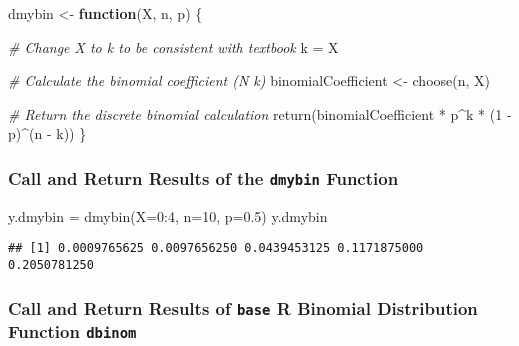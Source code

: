 \documentclass[
  12pt,
]{article}
\newenvironment{Shaded}{\begin{snugshade}}{\end{snugshade}}
\newcommand{\AttributeTok}[1]{\textcolor[rgb]{0.77,0.63,0.00}{#1}}
\newcommand{\CommentTok}[1]{\textcolor[rgb]{0.56,0.35,0.01}{\textit{#1}}}
\newcommand{\ControlFlowTok}[1]{\textcolor[rgb]{0.13,0.29,0.53}{\textbf{#1}}}
\newcommand{\DecValTok}[1]{\textcolor[rgb]{0.00,0.00,0.81}{#1}}
\newcommand{\FloatTok}[1]{\textcolor[rgb]{0.00,0.00,0.81}{#1}}
\newcommand{\FunctionTok}[1]{\textcolor[rgb]{0.00,0.00,0.00}{#1}}
\newcommand{\NormalTok}[1]{#1}
\newcommand{\OtherTok}[1]{\textcolor[rgb]{0.56,0.35,0.01}{#1}}
\newcommand{\SpecialCharTok}[1]{\textcolor[rgb]{0.00,0.00,0.00}{#1}}
\begin{document}
\begin{Shaded}
\begin{Highlighting}[]
\NormalTok{dmybin }\OtherTok{\textless{}{-}} \ControlFlowTok{function}\NormalTok{(X, n, p) \{}
  
  \CommentTok{\# Change X to k to be consistent with textbook}
\NormalTok{  k }\OtherTok{=}\NormalTok{ X}
  
  \CommentTok{\# Calculate the binomial coefficient (N k)}
\NormalTok{  binomialCoefficient }\OtherTok{\textless{}{-}} \FunctionTok{choose}\NormalTok{(n, X)}
  
  \CommentTok{\# Return the discrete binomial calculation}
  \FunctionTok{return}\NormalTok{(binomialCoefficient }\SpecialCharTok{*}\NormalTok{ p}\SpecialCharTok{\^{}}\NormalTok{k }\SpecialCharTok{*}\NormalTok{ (}\DecValTok{1} \SpecialCharTok{{-}}\NormalTok{ p)}\SpecialCharTok{\^{}}\NormalTok{(n }\SpecialCharTok{{-}}\NormalTok{ k))}
\NormalTok{\}}
\end{Highlighting}
\end{Shaded}

\hypertarget{call-and-return-results-of-the-dmybin-function}{%
\subsubsection{\texorpdfstring{Call and Return Results of the
\texttt{dmybin}
Function}{Call and Return Results of the dmybin Function}}\label{call-and-return-results-of-the-dmybin-function}}

\begin{Shaded}
\begin{Highlighting}[]
\NormalTok{y.dmybin }\OtherTok{=} \FunctionTok{dmybin}\NormalTok{(}\AttributeTok{X=}\DecValTok{0}\SpecialCharTok{:}\DecValTok{4}\NormalTok{, }\AttributeTok{n=}\DecValTok{10}\NormalTok{, }\AttributeTok{p=}\FloatTok{0.5}\NormalTok{)}
\NormalTok{y.dmybin}
\end{Highlighting}
\end{Shaded}

\begin{verbatim}
## [1] 0.0009765625 0.0097656250 0.0439453125 0.1171875000 0.2050781250
\end{verbatim}

\hypertarget{call-and-return-results-of-base-r-binomial-distribution-function-dbinom}{%
\subsubsection{\texorpdfstring{Call and Return Results of \texttt{base}
R Binomial Distribution Function
\texttt{dbinom}}{Call and Return Results of base R Binomial Distribution Function dbinom}}\label{call-and-return-results-of-base-r-binomial-distribution-function-dbinom}}
\end{document}
